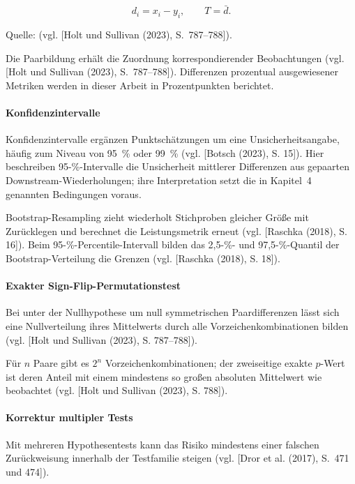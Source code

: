 \begin{equation*}
d_i=x_i-y_i,
\qquad
T=\bar{d}.
\end{equation*}

\begin{center}
    \footnotesize{Quelle: (vgl. [Holt und Sullivan (2023), S.~787--788]).}
\end{center}

Die Paarbildung erhält die Zuordnung korrespondierender Beobachtungen (vgl. [Holt und Sullivan (2023), S.~787--788]). Differenzen prozentual ausgewiesener Metriken werden in dieser Arbeit in Prozentpunkten berichtet.

\paragraph{Konfidenzintervalle} Konfidenzintervalle ergänzen Punktschätzungen um eine Unsicherheitsangabe, häufig zum Niveau von 95~\% oder 99~\% (vgl. [Botsch (2023), S. 15]). Hier beschreiben 95-\%-Intervalle die Unsicherheit mittlerer Differenzen aus gepaarten Downstream-Wiederholungen; ihre Interpretation setzt die in Kapitel~4 genannten Bedingungen voraus.

Bootstrap-Resampling zieht wiederholt Stichproben gleicher Größe mit Zurücklegen und berechnet die Leistungsmetrik erneut (vgl. [Raschka (2018), S. 16]). Beim 95-\%-Percentile-Intervall bilden das 2,5-\%- und 97,5-\%-Quantil der Bootstrap-Verteilung die Grenzen (vgl. [Raschka (2018), S. 18]).

\paragraph{Exakter Sign-Flip-Permutationstest} Bei unter der Nullhypothese um null symmetrischen Paardifferenzen lässt sich eine Nullverteilung ihres Mittelwerts durch alle Vorzeichenkombinationen bilden (vgl. [Holt und Sullivan (2023), S. 787--788]).

Für $n$ Paare gibt es $2^n$ Vorzeichenkombinationen; der zweiseitige exakte $p$-Wert ist deren Anteil mit einem mindestens so großen absoluten Mittelwert wie beobachtet (vgl. [Holt und Sullivan (2023), S. 788]).

\paragraph{Korrektur multipler Tests} Mit mehreren Hypothesentests kann das Risiko mindestens einer falschen Zurückweisung innerhalb der Testfamilie steigen (vgl. [Dror et al. (2017), S.~471 und 474]).

